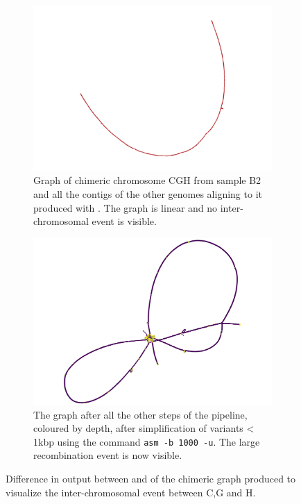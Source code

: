\begin{figure}[t]
	\centering
	\begin{subfigure}{\textwidth}
		\centering
		\includegraphics[width=.8\linewidth]{figures/minigraph_cgh.png}
		\caption{Graph of chimeric chromosome CGH from sample B2 and all the contigs of the other genomes aligning to it produced with \minigraph. The graph is linear and no inter-chromosomal event is visible.}
		\label{fig:cgh_mingraph}
	\end{subfigure}%

	\begin{subfigure}{\textwidth}
		\centering
		\includegraphics[width=.8\linewidth]{figures/mcactus_cgh_u1000_by_depth.png}
		\caption{The graph after all the other steps of the \mcactus pipeline, coloured by depth, after simplification of variants < 1kbp using the command \gfatools  \texttt{asm -b 1000 -u}. The large recombination event is now visible.}
		\label{fig:cgh_mcactus}
	\end{subfigure}
	\caption{Difference in output between \minigraph and \mcactus of the chimeric graph produced to visualize the inter-chromosomal event between C,G and H.}
	\label{fig:chromosome_cgh_minigraph}
\end{figure}

